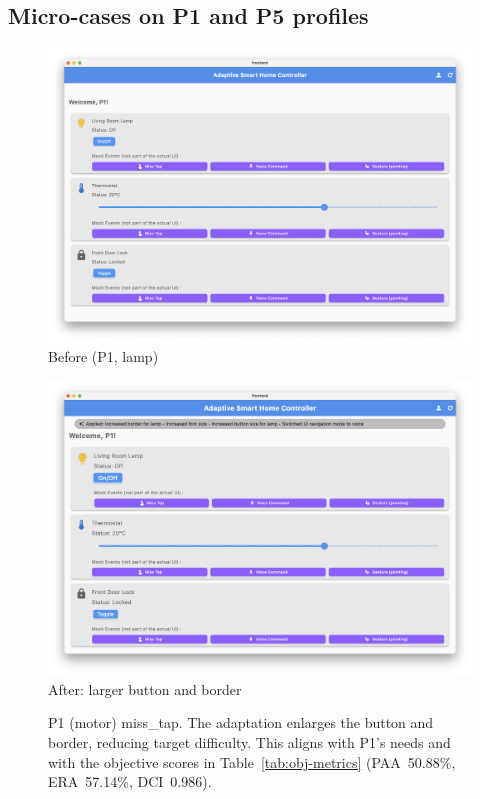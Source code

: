 \subsection{Micro-cases on P1 and P5 profiles}
\begin{figure}[H]
\centering
\begin{minipage}{0.48\textwidth}
  \includegraphics[width=\linewidth]{images/microcase_p1_before.png}\\[-0.5em]
  \centering\small Before (P1, lamp)
\end{minipage}\hfill
\begin{minipage}{0.48\textwidth}
  \includegraphics[width=\linewidth]{images/microcase_p1_after.png}\\[-0.5em]
  \centering\small After: larger button and border
\end{minipage}
\caption{P1 (motor) miss\_tap. The adaptation enlarges the button and border, reducing target difficulty. This aligns with P1’s needs and with the objective scores in Table~\ref{tab:obj-metrics} (PAA~50.88\%, ERA~57.14\%, DCI~0.986).}
\label{fig:micro-p1}
\end{figure}


